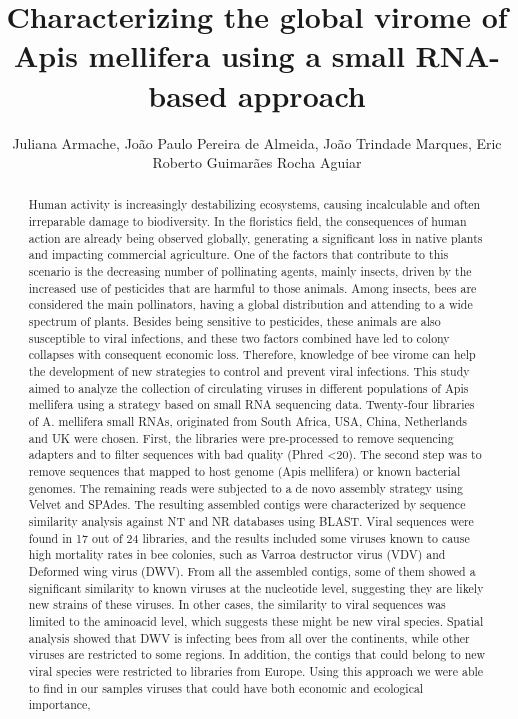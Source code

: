 \documentclass[twoside]{article}
\title{\vspace{-15mm}\fontsize{24pt}{10pt}\selectfont\textbf{ Characterizing the global virome of Apis mellifera using a small RNA-based approach }} %
\author{ Juliana Armache, Jo\~ao Paulo Pereira de Almeida, Jo\~ao Trindade Marques, Eric Roberto Guimar\~aes Rocha Aguiar }
\affil{ Universidade Federal de Minas Gerais }
\date{}
\begin{document}
  
  
  \maketitle %
  
  
  \thispagestyle{fancy} %
  
  
  \begin{abstract}
  Human activity is increasingly destabilizing ecosystems,  causing incalculable and often irreparable damage to biodiversity. In the floristics field,  the consequences of human action are already being observed globally,  generating a significant loss in native plants and impacting commercial agriculture. One of the factors that contribute to this scenario is the decreasing number of pollinating agents,  mainly insects,  driven by the increased use of pesticides that are harmful to those animals. Among insects,  bees are considered the main pollinators,  having a global distribution and attending to a wide spectrum of plants. Besides being sensitive to pesticides,  these animals are also susceptible to viral infections,  and these two factors combined have led to colony collapses with consequent economic loss. Therefore,  knowledge of bee virome can help the development of new strategies to control and prevent viral infections. This study aimed to analyze the collection of circulating viruses in different populations of  Apis mellifera  using a strategy based on small RNA sequencing data. Twenty-four libraries of A. mellifera small RNAs,  originated from South Africa,  USA,  China,  Netherlands and UK were chosen. First,  the libraries were pre-processed to remove sequencing adapters and to filter sequences with bad quality (Phred <20). The second step was to remove sequences that mapped to host genome (Apis mellifera) or known bacterial genomes. The remaining reads were subjected to a de novo assembly strategy using Velvet and SPAdes. The resulting assembled contigs were characterized by sequence similarity analysis against NT and NR databases using BLAST. Viral sequences were found in 17 out of 24 libraries,  and the results included some viruses known to cause high mortality rates in bee colonies,  such as  Varroa destructor virus  (VDV) and  Deformed wing virus  (DWV). From all the assembled contigs,  some of them showed a significant similarity  to known viruses at the nucleotide level,  suggesting they are likely new strains of these viruses. In other cases,  the similarity to viral sequences was limited to the aminoacid level,  which suggests these might be new viral species. Spatial analysis showed that DWV is infecting bees from all over the continents,  while other viruses are restricted to some regions. In addition,  the contigs that could belong to new viral species were restricted to libraries from Europe. Using this approach we were able to find in our samples viruses that could have both economic and ecological importance,  
\end{abstract}
\end{document}
